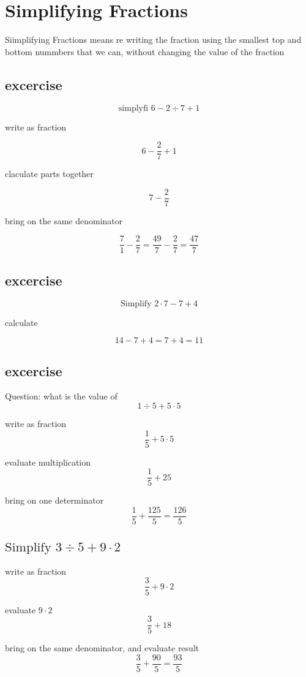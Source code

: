 \documentclass[12pt]{article}
\begin{document}
\section{Simplifying Fractions}


Siimplifying Fractions means re writing the fraction using the 
smallest top and bottom nummbers that we can, without changing the value of 
the fraction 

\subsection{excercise}
$$ \text{simplyfi } 6 - 2 \div 7 + 1 $$

write as fraction

$$ 6- \frac{2}{7} +1 $$

claculate parts together

$$ 7 - \frac{2}{7} $$

bring on the same denominator

$$ \frac{7}{1} - \frac{2}{7} = \frac{49}{7} - \frac{2}{7} = \frac{47}{7} $$

\subsection{excercise}

$$ \text{Simplify } 2 \cdot 7 - 7 + 4 $$

calculate

$$ 14 -7 + 4 = 7+4 = 11 $$

\subsection{excercise}

Question: what is the value of
$$ 1 \div 5 + 5 \cdot 5 $$

write as fraction
$$ \frac{1}{5} + 5 \cdot 5 $$

evaluate multiplication
$$ \frac{1}{5} + 25 $$

bring on one determinator
$$ \frac{1}{5} + \frac{125}{5} = \frac{126}{5}$$

\subsection{$ \text{Simplify } 3 \div 5 + 9 \cdot 2 $}

write as fraction
$$ \frac{3}{5} + 9 \cdot 2 $$

evaluate $ 9 \cdot 2 $
$$ \frac{3}{5} + 18 $$

bring on the same denominator, and evaluate result
$$ \frac{3}{5} + \frac{90}{5}  = \frac{93}{5}$$
\end{document}
